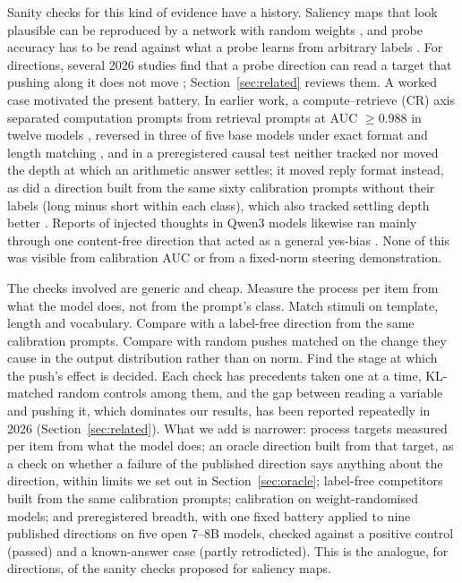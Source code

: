 \documentclass[11pt]{article}
\begin{document}
Sanity checks for this kind of evidence have a history. Saliency maps that look plausible can be reproduced by a network with random weights \citep{adebayo2018sanity}, and probe accuracy has to be read against what a probe learns from arbitrary labels \citep{hewitt2019control}. For directions, several 2026 studies find that a probe direction can read a target that pushing along it does not move \citep{xun2026lagged}; Section~\ref{sec:related} reviews them. A worked case motivated the present battery. In earlier work, a compute--retrieve (CR) axis separated computation prompts from retrieval prompts at AUC $\ge 0.988$ in twelve models \citep{ramdan2026crv1}, reversed in three of five base models under exact format and length matching \citep{ramdan2026fingerprint}, and in a preregistered causal test neither tracked nor moved the depth at which an arithmetic answer settles; it moved reply format instead, as did a direction built from the same sixty calibration prompts without their labels (long minus short within each class), which also tracked settling depth better \citep{ramdan2026crv2}. Reports of injected thoughts in Qwen3 models likewise ran mainly through one content-free direction that acted as a general yes-bias \citep{ramdan2026injected}. None of this was visible from calibration AUC or from a fixed-norm steering demonstration.

The checks involved are generic and cheap. Measure the process per item from what the model does, not from the prompt's class. Match stimuli on template, length and vocabulary. Compare with a label-free direction from the same calibration prompts. Compare with random pushes matched on the change they cause in the output distribution rather than on norm. Find the stage at which the push's effect is decided. Each check has precedents taken one at a time, KL-matched random controls among them, and the gap between reading a variable and pushing it, which dominates our results, has been reported repeatedly in 2026 (Section~\ref{sec:related}). What we add is narrower: process targets measured per item from what the model does; an oracle direction built from that target, as a check on whether a failure of the published direction says anything about the direction, within limits we set out in Section~\ref{sec:oracle}; label-free competitors built from the same calibration prompts; calibration on weight-randomised models; and preregistered breadth, with one fixed battery applied to nine published directions on five open 7--8B models, checked against a positive control (passed) and a known-answer case (partly retrodicted). This is the analogue, for directions, of the sanity checks \citet{adebayo2018sanity} proposed for saliency maps.
\end{document}
